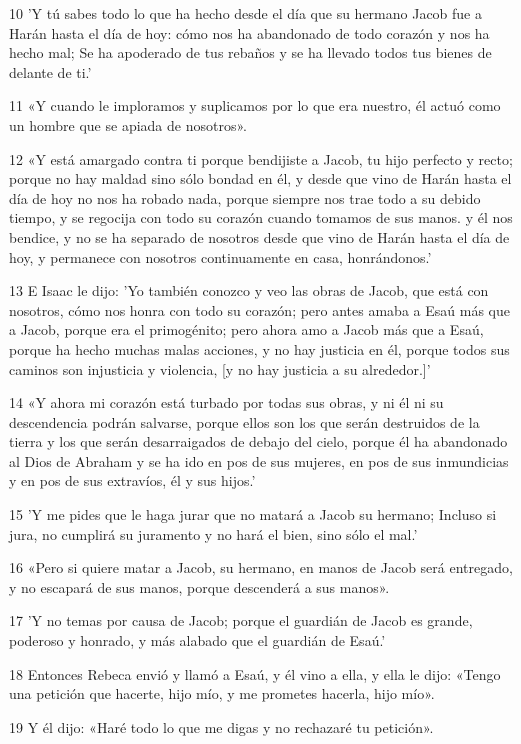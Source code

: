 \par 10 'Y tú sabes todo lo que ha hecho desde el día que su hermano Jacob fue a Harán hasta el día de hoy: cómo nos ha abandonado de todo corazón y nos ha hecho mal; Se ha apoderado de tus rebaños y se ha llevado todos tus bienes de delante de ti.'
\par 11 «Y cuando le imploramos y suplicamos por lo que era nuestro, él actuó como un hombre que se apiada de nosotros».
\par 12 «Y está amargado contra ti porque bendijiste a Jacob, tu hijo perfecto y recto; porque no hay maldad sino sólo bondad en él, y desde que vino de Harán hasta el día de hoy no nos ha robado nada, porque siempre nos trae todo a su debido tiempo, y se regocija con todo su corazón cuando tomamos de sus manos. y él nos bendice, y no se ha separado de nosotros desde que vino de Harán hasta el día de hoy, y permanece con nosotros continuamente en casa, honrándonos.'
\par 13 E Isaac le dijo: 'Yo también conozco y veo las obras de Jacob, que está con nosotros, cómo nos honra con todo su corazón; pero antes amaba a Esaú más que a Jacob, porque era el primogénito; pero ahora amo a Jacob más que a Esaú, porque ha hecho muchas malas acciones, y no hay justicia en él, porque todos sus caminos son injusticia y violencia, [y no hay justicia a su alrededor.]'
\par 14 «Y ahora mi corazón está turbado por todas sus obras, y ni él ni su descendencia podrán salvarse, porque ellos son los que serán destruidos de la tierra y los que serán desarraigados de debajo del cielo, porque él ha abandonado al Dios de Abraham y se ha ido en pos de sus mujeres, en pos de sus inmundicias y en pos de sus extravíos, él y sus hijos.'
\par 15 'Y me pides que le haga jurar que no matará a Jacob su hermano; Incluso si jura, no cumplirá su juramento y no hará el bien, sino sólo el mal.'
\par 16 «Pero si quiere matar a Jacob, su hermano, en manos de Jacob será entregado, y no escapará de sus manos, porque descenderá a sus manos».
\par 17 'Y no temas por causa de Jacob; porque el guardián de Jacob es grande, poderoso y honrado, y más alabado que el guardián de Esaú.'
\par 18 Entonces Rebeca envió y llamó a Esaú, y él vino a ella, y ella le dijo: «Tengo una petición que hacerte, hijo mío, y me prometes hacerla, hijo mío».
\par 19 Y él dijo: «Haré todo lo que me digas y no rechazaré tu petición».
